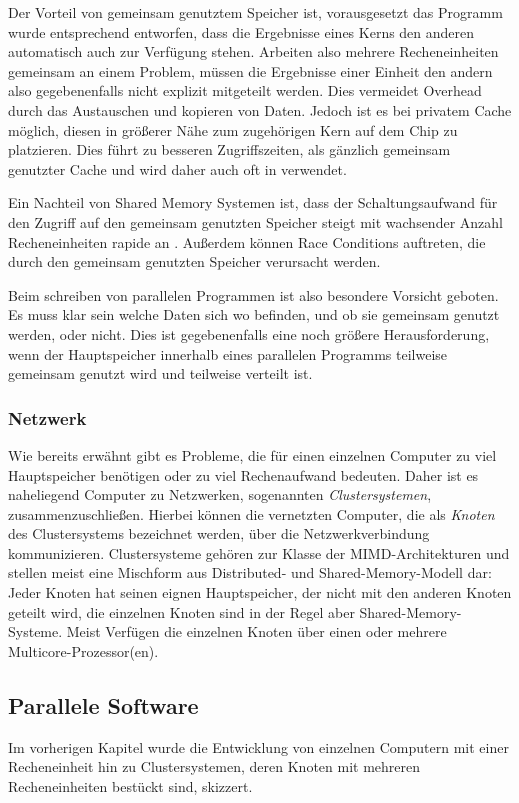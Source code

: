 	
	Der Vorteil von gemeinsam genutztem Speicher ist, vorausgesetzt das Programm wurde entsprechend entworfen, dass die Ergebnisse eines Kerns den anderen automatisch auch zur Verfügung stehen. 
	Arbeiten  also mehrere Recheneinheiten gemeinsam an einem Problem, müssen die Ergebnisse einer Einheit den andern also gegebenenfalls nicht explizit mitgeteilt werden. Dies vermeidet Overhead
	durch das Austauschen und kopieren von Daten.
	Jedoch ist es bei privatem Cache möglich, diesen in größerer Nähe zum zugehörigen Kern auf dem Chip zu platzieren. Dies führt zu besseren Zugriffszeiten, als gänzlich gemeinsam genutzter 
	Cache und wird daher auch oft in verwendet. 
	
	Ein Nachteil von Shared Memory Systemen ist, dass der Schaltungsaufwand für den Zugriff auf den gemeinsam genutzten Speicher steigt mit wachsender Anzahl Recheneinheiten rapide an
	\citep{hpcskript}. Außerdem können Race Conditions auftreten, die durch den gemeinsam genutzten Speicher verursacht werden.
	
	Beim schreiben von parallelen Programmen ist also besondere Vorsicht geboten. Es muss klar sein welche Daten sich wo befinden, und ob sie gemeinsam genutzt werden, oder nicht.
	Dies ist gegebenenfalls eine noch größere Herausforderung, wenn der Hauptspeicher innerhalb eines parallelen Programms teilweise gemeinsam genutzt wird und teilweise verteilt ist.
	
      \subsubsection{Netzwerk}
      \label{sec:netzwerk}
		
	Wie bereits erwähnt gibt es Probleme, die für einen einzelnen Computer zu viel Hauptspeicher benötigen oder zu viel Rechenaufwand bedeuten. Daher ist es naheliegend Computer zu Netzwerken,
	sogenannten \textit{Clustersystemen}, zusammenzuschließen. Hierbei können die vernetzten Computer, die als \textit{Knoten} des Clustersystems bezeichnet werden, über die 
	Netzwerkverbindung kommunizieren. Clustersysteme gehören zur Klasse der MIMD-Architekturen und stellen meist eine Mischform aus Distributed- und Shared-Memory-Modell dar: Jeder Knoten hat 
	seinen eignen Hauptspeicher, der nicht mit den anderen Knoten geteilt wird, die einzelnen Knoten sind in der Regel aber Shared-Memory-Systeme. Meist Verfügen die einzelnen Knoten über
	einen oder mehrere Multicore-Prozessor(en).
	
    \subsection{Parallele Software}
      Im vorherigen Kapitel wurde die Entwicklung von einzelnen Computern mit einer Recheneinheit hin zu Clustersystemen, deren Knoten mit mehreren Recheneinheiten bestückt sind, skizzert.
      

